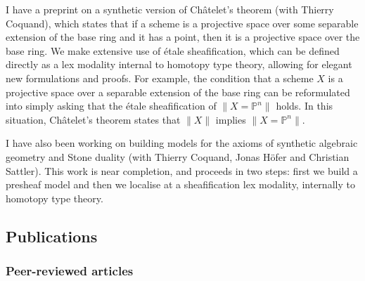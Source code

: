 \documentclass{article}
\newcommand{\propTrunc}[1]{\lVert #1\rVert}
\begin{document}
I have a preprint on a synthetic version of Ch\^atelet's theorem (with Thierry Coquand), which states that if a scheme is a projective space over some separable extension of the base ring and it has a point, then it is a projective space over the base ring. We make extensive use of étale sheafification, which can be defined directly as a lex modality internal to homotopy type theory, allowing for elegant new formulations and proofs. For example, the condition that a scheme $X$ is a projective space over a separable extension of the base ring can be reformulated into simply asking that the étale sheafification of $\propTrunc{X=\mathbb{P}^n}$ holds. In this situation, Ch\^atelet's theorem states that $\propTrunc{X}$ implies $\propTrunc{X=\mathbb{P}^n}$.


I have also been working on building models for the axioms of synthetic algebraic geometry and Stone duality (with Thierry Coquand, Jonas H\"ofer and Christian Sattler). This work is near completion, and proceeds in two steps: first we build a presheaf model and then we localise at a sheafification lex modality, internally to homotopy type theory.



\subsection{Publications}

\subsubsection{Peer-reviewed articles}
\begin{itemize}
\end{itemize}
\end{document}
